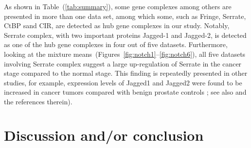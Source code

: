 \documentclass[10pt]{article}
\begin{document}
As shown in Table~(\ref{tab:summary}), some gene complexes among others are presented in more than one data set, among which some, such as Fringe, Serrate, CtBP sand CIR, are detected as hub gene complexes in our study. Notably, Serrate complex, with two important proteins Jagged-1 and Jagged-2, is detected as one of the hub gene complexes in four out of five datasets. Furthermore, looking at the mixture means~(Figures~\ref{fig:notch1}--\ref{fig:notch6}), all five datasets involving Serrate complex suggest a large up-regulation of Serrate in the cancer stage compared to the normal stage.  This finding is repeatedly presented in other studies, for example, expression levels of Jagged1 and Jagged2 were found to be increased in cancer tumors compared with benign prostate controls \citep{santagata2004jagged1}; see also \citet{carvalho2014notch} and the references therein).




\section{Discussion and/or conclusion}\label{discussion}




\setlength{\bibsep}{2pt}
% 
% 


% 
% 

\setlength{\bibsep}{2pt}


\newpage
\end{document}

